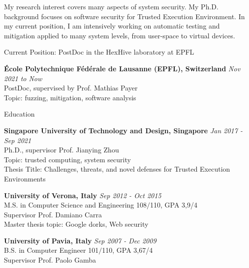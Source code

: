 \documentclass{resume} %
\begin{document}
	
My research interest covers many aspects of system security. My Ph.D. background
focuses on software security for Trusted Execution Environment. In my current position, I am intensively working on automatic testing and mitigation applied
to many system levels, from user-space to virtual devices.

\begin{rSection}{Current Position: PostDoc in the HexHive laboratory at EPFL}
	
	{\bf \'Ecole Polytechnique F\'ed\'erale de Lausanne (EPFL), Switzerland} 
	\hfill {\em Nov 2021 to Now} \\
	PostDoc, supervised by Prof. Mathias Payer \\
	Topic: fuzzing, mitigation, software analysis

\end{rSection}


\begin{rSection}{Education}
    
{\bf Singapore University of Technology and Design, Singapore} \hfill {\em Jan
2017 - Sep 2021} \\
Ph.D., supervisor Prof. Jianying Zhou \\
Topic: trusted computing, system security \\
Thesis Title: Challenges, threats, and novel defenses for Trusted Execution
Environments

{\bf University of Verona, Italy} \hfill {\em Sep 2012 - Oct 2015} \\
M.S. in Computer Science and Engineering 108$/$110, GPA 3,9/4 \\
Supervisor Prof. Damiano Carra \\
Master thesis topic: Google dorks, Web security


{\bf University of Pavia, Italy} \hfill {\em Sep 2007 - Dec 2009} \\ 
B.S. in Computer Engineer 101$/$110, GPA 3,67/4 \\
Supervisor Prof. Paolo Gamba \\


\end{rSection}

\end{document}
